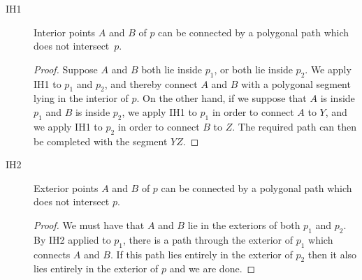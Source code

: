 \begin{description}
\item[IH1] Interior points $A$ and $B$ of $p$ can be connected by a polygonal path which does not intersect~$p$.
  \begin{proof}
    Suppose $A$ and $B$ both lie inside $p_1$, or both lie inside $p_2$. We apply IH1 to $p_1$ and $p_2$, and thereby connect $A$ and $B$ with a polygonal segment lying in the interior of $p$. On the other hand, if we suppose that $A$ is inside $p_1$ and $B$ is inside $p_2$, we apply IH1 to $p_1$ in order to connect $A$ to $Y$, and we apply IH1 to $p_2$ in order to connect $B$ to $Z$. The required path can then be completed with the segment $YZ$.
  \end{proof}
\item[IH2] Exterior points $A$ and $B$ of $p$ can be connected by a polygonal path which does not intersect $p$.
  \begin{proof}
    We must have that $A$ and $B$ lie in the exteriors of both $p_1$ and $p_2$. By IH2 applied to $p_1$, there is a path through the exterior of $p_1$ which connects $A$ and $B$. If this path lies entirely in the exterior of $p_2$ then it also lies entirely in the exterior of $p$ and we are done. 


\end{proof}
\end{description}
